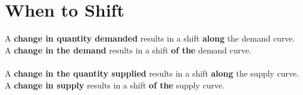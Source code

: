 \section{When to Shift}
A \textbf{change in quantity demanded} results in a shift \textbf{along} the demand curve.\\
A \textbf{change in the demand} results in a shift \textbf{of the} demand curve.\\\\
A \textbf{change in the quantity supplied} results in a shift \textbf{along} the supply curve.\\
A \textbf{change in supply} results in a shift \textbf{of the} supply curve.\\